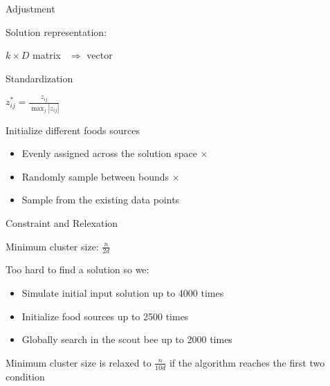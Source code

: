 \documentclass[14pt,ignorenonframetext,compress]{beamer}
\providecommand{\tightlist}{%
  \setlength{\itemsep}{0pt}\setlength{\parskip}{0pt}}
\begin{document}
\begin{frame}{Adjustment}
\protect\hypertarget{adjustment}{}

\begin{block}{Solution representation:}

\(k\times D\) matrix \pause  \(\ \ \Rightarrow\) vector

\pause

\end{block}

\begin{block}{Standardization}

\(z^*_{ij} = \frac{z_{ij}}{\max_{j}|z_{ij}|}\)

\pause

\end{block}

\begin{block}{Initialize different foods sources}

\begin{itemize}
\tightlist
\item
  Evenly assigned across the solution space \(\times\)
\item
  Randomly sample between bounds \(\times\) \pause
\item
  Sample from the existing data points
\end{itemize}

\end{block}

\end{frame}

\begin{frame}{Constraint and Relexation}
\protect\hypertarget{constraint-and-relexation}{}

Minimum cluster size: \(\frac{n}{2d}\)

Too hard to find a solution so we:

\begin{itemize}
\tightlist
\item
  Simulate initial input solution up to 4000 times
\item
  Initialize food sources up to 2500 times
\item
  Globally search in the scout bee up to 2000 times
\end{itemize}

\pause

Minimum cluster size is relaxed to \(\frac{n}{10d}\) if the algorithm
reaches the first two condition

\end{frame}
\end{document}
